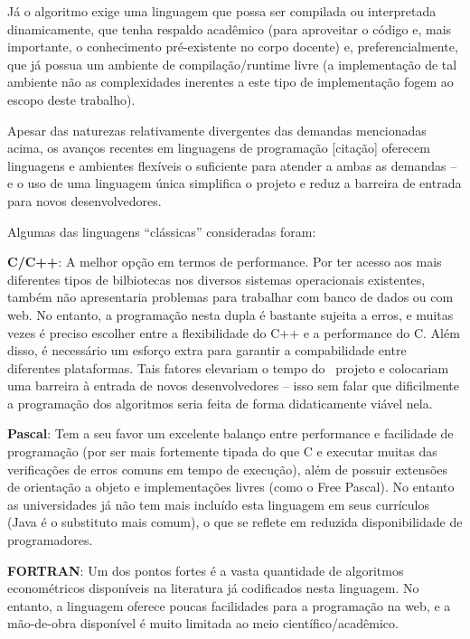 \documentclass[12pt,twoside]{article}
\begin{document}
J\'a o algoritmo exige uma linguagem que possa ser compilada ou
interpretada dinamicamente, que tenha respaldo acad\^emico (para
aproveitar o c\'odigo e, mais importante, o conhecimento
pr\'e{}-existente no corpo docente) e, preferencialmente, que j\'a
possua um ambiente de compila\c{c}\~ao/runtime livre (a
implementa\c{c}\~ao de tal ambiente n\~ao as complexidades inerentes a
este tipo de implementa\c{c}\~ao fogem ao escopo deste trabalho). 

Apesar das naturezas relativamente divergentes das demandas mencionadas
acima, os avan\c{c}os recentes em linguagens de programa\c{c}\~ao
[cita\c{c}\~ao] oferecem linguagens e ambientes flex\'iveis o
suficiente para atender a ambas as demandas {--} e o uso de uma
linguagem \'unica simplifica o projeto e reduz a barreira de entrada
para novos desenvolvedores.

Algumas das linguagens ``cl\'assicas'' consideradas foram:

\textbf{C/C++}: A melhor op\c{c}\~ao em termos de performance. Por ter
acesso aos mais diferentes tipos de bilbiotecas nos diversos sistemas
operacionais existentes, tamb\'em n\~ao apresentaria problemas para
trabalhar com banco de dados ou com web. No entanto, a
programa\c{c}\~ao nesta dupla \'e bastante sujeita a erros, e muitas
vezes \'e preciso escolher entre a flexibilidade do C++ e a performance
do C. Al\'em disso, \'e necess\'ario um esfor\c{c}o extra para garantir
a compabilidade entre diferentes plataformas. Tais fatores elevariam o
tempo do \ projeto e colocariam uma barreira \`a entrada de novos
desenvolvedores {--} isso sem falar que dificilmente a
programa\c{c}\~ao dos algoritmos seria feita de forma didaticamente
vi\'avel nela.

\textbf{Pascal}: Tem a seu favor um excelente balan\c{c}o entre
performance e facilidade de programa\c{c}\~ao (por ser mais fortemente
tipada do que C e executar muitas das verifica\c{c}\~oes de erros
comuns em tempo de execu\c{c}\~ao), al\'em de possuir extens\~oes de
orienta\c{c}\~ao a objeto e implementa\c{c}\~oes livres (como o Free
Pascal). No entanto as universidades j\'a n\~ao tem mais inclu\'ido
esta linguagem em seus curr\'iculos (Java \'e o substituto mais comum),
o que se reflete em reduzida disponibilidade de programadores.

\textbf{FORTRAN}: Um dos pontos fortes \'e a vasta quantidade de
algoritmos econom\'etricos dispon\'iveis na literatura j\'a codificados
nesta linguagem. No entanto, a linguagem oferece poucas facilidades
para a programa\c{c}\~ao na web, e a m\~ao{}-de{}-obra dispon\'ivel \'e
muito limitada ao meio cient\'ifico/acad\^emico.
\end{document}

